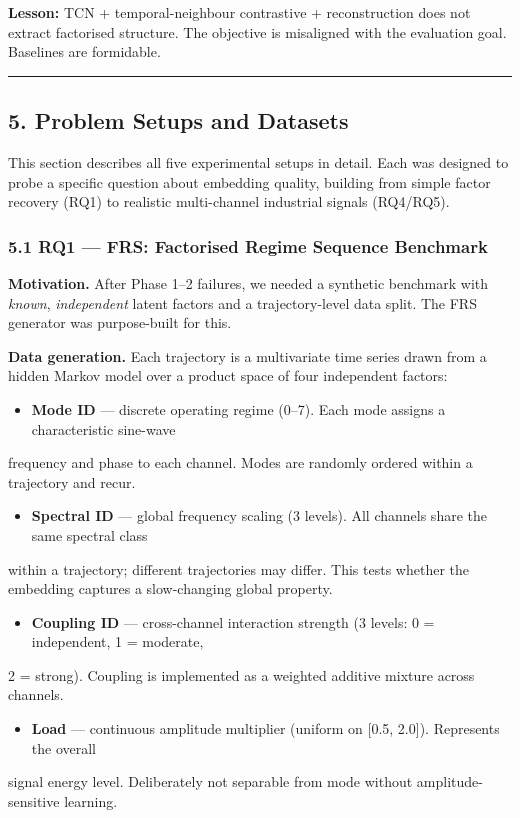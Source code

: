 \documentclass[11pt,a4paper]{article}
\begin{document}
\textbf{Lesson:} TCN + temporal-neighbour contrastive + reconstruction does not extract factorised
structure. The objective is misaligned with the evaluation goal. Baselines are formidable.

\vspace{4pt}\hrule\vspace{4pt}

\subsection{5. Problem Setups and Datasets}

This section describes all five experimental setups in detail. Each was designed to probe a
specific question about embedding quality, building from simple factor recovery (RQ1) to
realistic multi-channel industrial signals (RQ4/RQ5).

\subsubsection{5.1 RQ1 --- FRS: Factorised Regime Sequence Benchmark}

\textbf{Motivation.} After Phase 1--2 failures, we needed a synthetic benchmark with \textit{known}, \textit{independent}
latent factors and a trajectory-level data split. The FRS generator was purpose-built for this.

\textbf{Data generation.} Each trajectory is a multivariate time series drawn from a hidden Markov model
over a product space of four independent factors:

\begin{itemize}
  \item \textbf{Mode ID} --- discrete operating regime (0--7). Each mode assigns a characteristic sine-wave
\end{itemize}
  frequency and phase to each channel. Modes are randomly ordered within a trajectory and recur.
\begin{itemize}
  \item \textbf{Spectral ID} --- global frequency scaling (3 levels). All channels share the same spectral class
\end{itemize}
  within a trajectory; different trajectories may differ. This tests whether the embedding captures
  a slow-changing global property.
\begin{itemize}
  \item \textbf{Coupling ID} --- cross-channel interaction strength (3 levels: 0 = independent, 1 = moderate,
\end{itemize}
  2 = strong). Coupling is implemented as a weighted additive mixture across channels.
\begin{itemize}
  \item \textbf{Load} --- continuous amplitude multiplier (uniform on [0.5, 2.0]). Represents the overall
\end{itemize}
  signal energy level. Deliberately not separable from mode without amplitude-sensitive learning.
\end{document}
